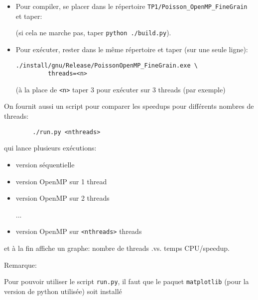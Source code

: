 \documentclass{beamer}
\begin{document}
\begin{frame}[fragile]

\begin{itemize}
	\item 	Pour compiler, se placer dans le répertoire {\tt TP1/Poisson\_OpenMP\_FineGrain} et taper:
	
	
	\vfill
	(si cela ne marche pas, taper \verb|python ./build.py|).
	
	\vfill
	\item Pour exécuter, rester dans le même répertoire et taper (sur une seule ligne):
	
	\hspace{2cm}
	{\color{blue}\begin{verbatim}
./install/gnu/Release/PoissonOpenMP_FineGrain.exe \
		 threads=<n>
\end{verbatim}
	}
	
	\vfill
	(à la place de {\tt <n>} taper 3 pour exécuter sur 3 threads (par exemple)
	\vfill
	
\end{itemize}
\end{frame}


\begin{frame}[fragile]
	On fournit aussi un script pour comparer les speedups pour différents nombres de threads:
	
	{\color{blue}\begin{verbatim}
		./run.py <nthreads>
		\end{verbatim}
	}
	qui lance plusieurs exécutions:
	\begin{itemize}
		\item version séquentielle
		\item version OpenMP sur 1 thread
		\item version OpenMP sur 2 threads
		
		...
		\item version OpenMP sur \verb|<nthreads>| threads
	\end{itemize}
	
	et à la fin affiche un graphe: nombre de threads .vs. temps CPU/speedup.
	
	\vfill
	Remarque:
	\medskip
	
	\hspace{1cm}\begin{minipage}{0.9\textwidth}
		Pour pouvoir utiliser le script {\tt run.py},
		il faut que le paquet {\tt matplotlib} (pour la version de python utilisée) soit installé
	\end{minipage}
	
\end{frame}
\end{document}

